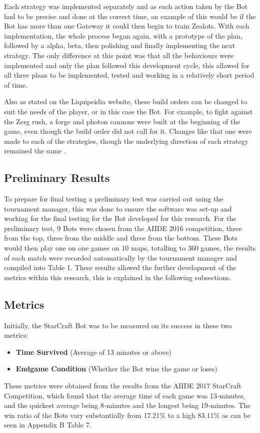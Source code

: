 \documentclass[journal]{IEEEtran}
\begin{document}
	Each strategy was implemented separately and as each action taken by the Bot had to be precise and done at the correct time, an example of this would be if the Bot has more than one Gateway it could then begin to train Zealots. With each implementation, the whole process began again, with a prototype of the plan, followed by a alpha, beta, then polishing and finally implementing the next strategy. The only difference at this point was that all the behaviours were implemented and only the plan followed this development cycle, this allowed for all three plans to be implemented, tested and working in a relatively short period of time.
	
	Also as stated on the Liquipeidia website, these build orders can be changed to suit the needs of the player, or in this case the Bot. For example, to fight against the Zerg rush, a forge and photon cannons were built at the beginning of the game, even though the build order did not call for it. Changes like that one were made to each of the strategies, though the underlying direction of each strategy remained the same \cite{Alter}.
	
	\subsection{Preliminary Results}
	To prepare for final testing a preliminary test was carried out using the tournament manager, this was done to ensure the software was set-up and working for the final testing for the Bot developed for this research. For the preliminary test, 9 Bots were chosen from the AIIDE 2016 competition, three from the top, three from the middle and three from the bottom. These Bots would then play one on one games on 10 maps, totalling to 360 games, the results of each match were recorded automatically by the tournament manager and compiled into Table 1. These results allowed the further development of the metrics within this research, this is explained in the following subsections.
	
	\subsection{Metrics}
	
	Initially, the StarCraft Bot was to be measured on its success in these two metrics:
	\begin{itemize}
		\item \textbf{Time Survived} (Average of 13 minutes or above)
		\item \textbf{Endgame Condition} (Whether the Bot wins the game or loses)
	\end{itemize}
	These metrics were obtained from the results from the AIIDE 2017 StarCraft Competition, which found that the average time of each game was 13-minutes, and the quickest average being 8-minutes and the longest being 19-minutes. The win ratio of the Bots vary substantially from 17.21\% to a high 83.11\% as can be seen in Appendix B Table 7. 
	
\end{document}
